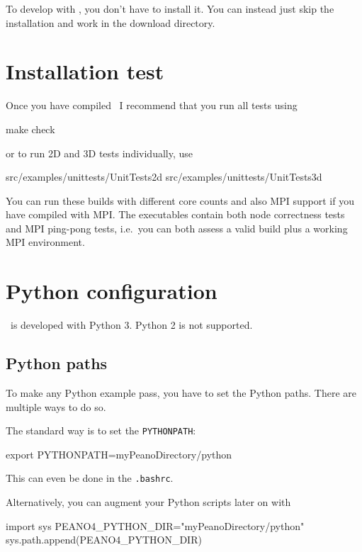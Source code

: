 \begin{remark}
 To develop with \Peano, you don't have to install it. You can instead just skip
 the installation and work in the download directory.
\end{remark}




\section{Installation test}

Once you have compiled \Peano\, I recommend that you run all tests using

\begin{code}
  make check
\end{code}
or to run 2D and 3D tests individually, use

\begin{code}
  src/examples/unittests/UnitTests2d
  src/examples/unittests/UnitTests3d
\end{code}

\noindent
You can run these builds with different core counts and also MPI support if you
have compiled with MPI.
The executables contain both node correctness tests and MPI ping-pong tests,
i.e.~you can both assess a valid build plus a working MPI environment.



\section{Python configuration}

\Peano\ is developed with Python 3. Python 2 is not supported. 


\subsection{Python paths}
To make any Python example pass, you have to set the Python paths.
There are multiple ways to do so.

The standard way is to set the \texttt{PYTHONPATH}:
\begin{code}
export PYTHONPATH=myPeanoDirectory/python
\end{code}
This can even be done in the \texttt{.bashrc}.

Alternatively, you can augment your Python scripts later on with 
\begin{code}
import sys
PEANO4_PYTHON_DIR="myPeanoDirectory/python"
sys.path.append(PEANO4_PYTHON_DIR)
\end{code}


